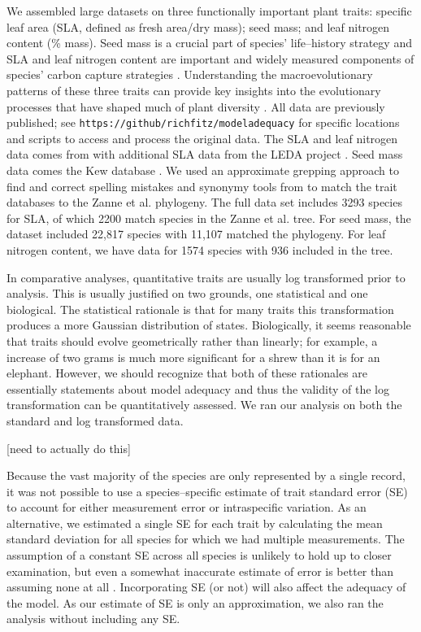 \documentclass[a4paper,11pt]{article}
\begin{document}
We assembled large datasets on three functionally important plant traits: specific leaf area (SLA, defined as fresh area/dry mass); seed mass; and leaf nitrogen content (\% mass). Seed mass is a crucial part of species' life--history strategy \citep{Leishman2000, Westoby2002} and SLA and leaf nitrogen content are important and widely measured components of species' carbon capture strategies \citep{Wright2004}. Understanding the macroevolutionary patterns of these three traits can provide key insights into the evolutionary processes that have shaped much of plant diversity \citep{ksi}. All data are previously published; see \texttt{https://github/richfitz/modeladequacy} for specific locations and scripts to access and process the original data. The SLA and leaf nitrogen data comes from \citet{Wright2004} with additional SLA data from the LEDA project \citep{Kleyer2008}. Seed mass data comes the Kew database \citep{Kew2008}. We used an approximate grepping approach to find and correct spelling mistakes and synonymy tools from \citet{plantlist} to match the trait databases to the Zanne et al. phylogeny. 
The full data set includes 3293 species for SLA, of which 2200 match species in the Zanne et al. tree. For seed mass, the dataset included 22,817 species with 11,107 matched the phylogeny. For leaf nitrogen content, we have data for 1574 species with 936 included in the tree. 

In comparative analyses, quantitative traits are usually log transformed prior to analysis. This is usually justified on two grounds, one statistical and one biological. The statistical rationale is that for many traits this transformation produces a more Gaussian distribution of states. Biologically, it seems reasonable that traits should evolve geometrically rather than linearly; for example, a increase of two grams is much more significant for a shrew than it is for an elephant. However, we should recognize that both of these rationales are essentially statements about model adequacy and thus the validity of the log transformation can be quantitatively assessed. We ran our analysis on both the standard and log transformed data.

[need to actually do this]

Because the vast majority of the species are only represented by a single
record, it was not possible to use a species--specific estimate of
trait standard error (SE) to account for either measurement error or
intraspecific variation.  As an alternative, we estimated a single SE for each trait
by calculating the mean
standard deviation for all species for which we had multiple
measurements. The assumption of a constant SE across all species is
unlikely to hold up to closer examination, but even a somewhat
inaccurate estimate of error is better than assuming none at all
\citep{Hansen2012}. Incorporating SE (or not) will also affect the adequacy of the model. As our estimate of SE is only an approximation, we also ran the analysis without including any SE.
\end{document}
